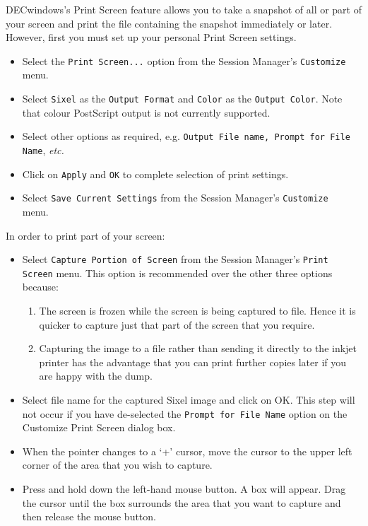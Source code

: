 DECwindows's Print Screen feature allows you to take a snapshot of all or part
of your screen and print the file containing the snapshot immediately or later.
However, first you must set up your personal Print Screen settings.

\begin{itemize}

\item Select the {\tt Print Screen...} option from the Session Manager's
{\tt Customize} menu.

\item Select {\tt Sixel} as the {\tt Output Format} and {\tt Color} as the 
{\tt Output Color}. Note that colour PostScript output is not currently 
supported.

\item Select other options as required, e.g. {\tt Output File name, Prompt for
File Name}, {\it etc.}

\item Click on {\tt Apply} and {\tt OK} to complete selection of print settings.

\item Select {\tt Save Current Settings} from the Session Manager's 
{\tt Customize }
menu.

\end{itemize}

In order to print part of your screen:

\begin{itemize}

\item Select {\tt Capture Portion of Screen} from the Session Manager's
{\tt Print Screen} menu. This option is recommended over the other three options
because:

\begin{enumerate} 

\item The screen is frozen while the screen is being captured to file. Hence it
is quicker to capture just that part of the screen that you require.

\item Capturing the image to a file rather than sending it directly to the 
inkjet printer has the advantage that you can print further copies later
if you are happy with the dump.

\end{enumerate}

\item Select file name for the captured Sixel image and click on OK. This step
will not occur if you have de-selected the {\tt Prompt for File Name} option on
the Customize Print Screen dialog box.

\item When the pointer changes to a `+' cursor, move the cursor to the upper
left corner of the area that you wish to capture. 

\item Press and hold down the left-hand mouse button. A box will appear. Drag
the cursor until the box surrounds the area that you want to capture and 
then release the mouse button.

\end{itemize}

